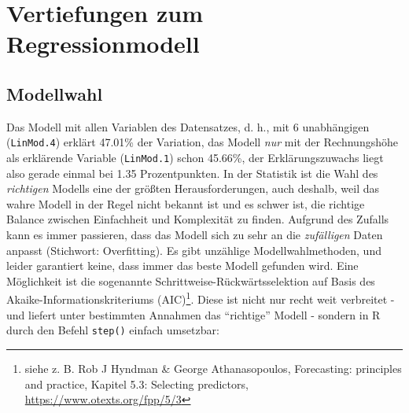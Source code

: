\documentclass[12pt,ngerman,]{book}
\let\rmarkdownfootnote\footnote%
\def\footnote{\protect\rmarkdownfootnote}
\begin{document}
\section{Vertiefungen zum
Regressionmodell}\label{vertiefungen-zum-regressionmodell}

\subsection{Modellwahl}\label{modellwahl}

Das Modell mit allen Variablen des Datensatzes, d. h., mit 6
unabhängigen (\texttt{LinMod.4}) erklärt 47.01\% der Variation, das
Modell \emph{nur} mit der Rechnungshöhe als erklärende Variable
(\texttt{LinMod.1}) schon 45.66\%, der Erklärungszuwachs liegt also
gerade einmal bei 1.35 Prozentpunkten. In der Statistik ist die Wahl des
\emph{richtigen} Modells eine der größten Herausforderungen, auch
deshalb, weil das wahre Modell in der Regel nicht bekannt ist und es
schwer ist, die richtige Balance zwischen Einfachheit und Komplexität zu
finden. Aufgrund des Zufalls kann es immer passieren, dass das Modell
sich zu sehr an die \emph{zufälligen} Daten anpasst (Stichwort:
Overfitting). Es gibt unzählige Modellwahlmethoden, und leider
garantiert keine, dass immer das beste Modell gefunden wird. Eine
Möglichkeit ist die sogenannte Schrittweise-Rückwärtsselektion auf Basis
des Akaike-Informationskriteriums (AIC)\footnote{siehe z. B. Rob J
  Hyndman \& George Athanasopoulos, Forecasting: principles and
  practice, Kapitel 5.3: Selecting predictors,
  \url{https://www.otexts.org/fpp/5/3}}. Diese ist nicht nur recht weit
verbreitet - und liefert unter bestimmten Annahmen das ``richtige''
Modell - sondern in R durch den Befehl \texttt{step()} einfach
umsetzbar:
\end{document}
